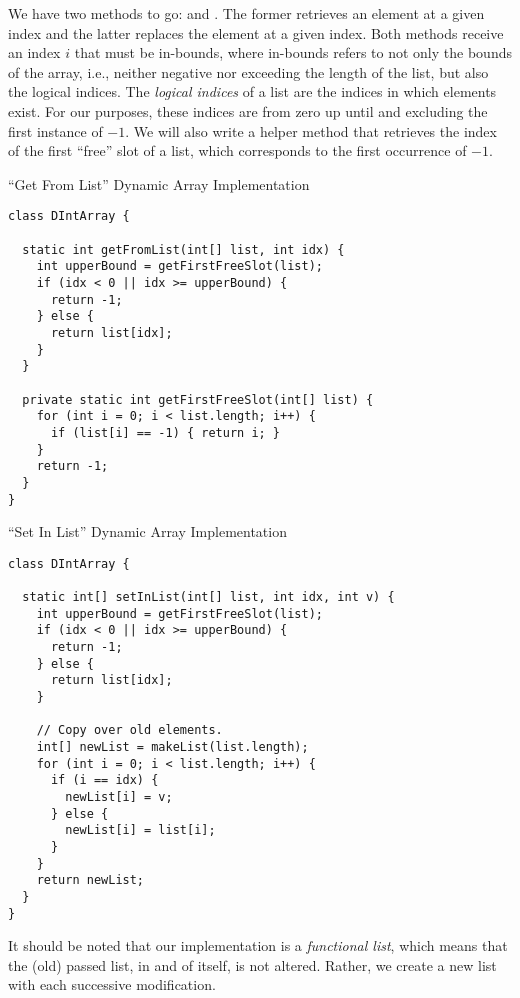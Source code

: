 We have two methods to go:  and . The former retrieves an element at a given index and the latter replaces the element at a given index. Both methods receive an index $i$ that must be in-bounds, where in-bounds refers to not only the bounds of the array, i.e., neither negative nor exceeding the length of the list, but also the logical indices. The \textit{logical indices} of a list are the indices in which elements exist. For our purposes, these indices are from zero up until and excluding the first instance of $-1$. We will also write a helper method that retrieves the index of the first ``free'' slot of a list, which corresponds to the first occurrence of $-1$.

\begin{cl}[]{``Get From List'' Dynamic Array Implementation}
\begin{lstlisting}[language=MyJava]
class DIntArray {

  static int getFromList(int[] list, int idx) {
    int upperBound = getFirstFreeSlot(list);
    if (idx < 0 || idx >= upperBound) {
      return -1;
    } else {
      return list[idx];
    }
  }

  private static int getFirstFreeSlot(int[] list) {
    for (int i = 0; i < list.length; i++) {
      if (list[i] == -1) { return i; }
    }
    return -1;
  }
}
\end{lstlisting}
\end{cl}

\begin{cl}[]{``Set In List'' Dynamic Array Implementation}
\begin{lstlisting}[language=MyJava]
class DIntArray {

  static int[] setInList(int[] list, int idx, int v) {
    int upperBound = getFirstFreeSlot(list);
    if (idx < 0 || idx >= upperBound) {
      return -1;
    } else {
      return list[idx];
    }

    // Copy over old elements.
    int[] newList = makeList(list.length);
    for (int i = 0; i < list.length; i++) {
      if (i == idx) {
        newList[i] = v;
      } else {
        newList[i] = list[i];
      }
    }
    return newList;
  }
}
\end{lstlisting}
\end{cl}

It should be noted that our implementation is a \textit{functional list}, which means that the (old) passed list, in and of itself, is not altered. Rather, we create a new list with each successive modification.

